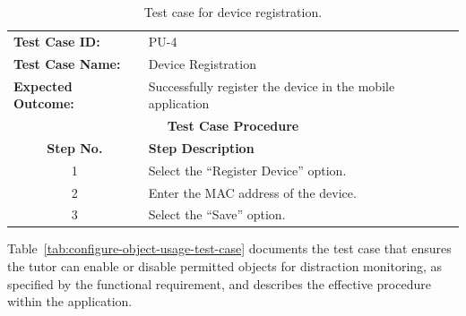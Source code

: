                 \begin{table}[!htbp]
                    \centering
                    \caption{Test case for device registration.}
                    \label{tab:device-registration-test-case}
                    \begin{tabularx}{\textwidth}{l X}
                        \toprule
                        \textbf{Test Case ID:} & PU-4 \\
                        \textbf{Test Case Name:} & Device Registration \\
                        \textbf{Expected Outcome:} & Successfully register the device in the mobile application \\
                        \midrule
                        \multicolumn{2}{c}{\textbf{Test Case Procedure}} \\
                        \midrule
                        \multicolumn{1}{c}{\textbf{Step No.}} & \textbf{Step Description} \\
                        \midrule
                        \multicolumn{1}{c}{1} & Select the ``Register Device'' option. \\
                        \multicolumn{1}{c}{2} & Enter the MAC address of the device. \\
                        \multicolumn{1}{c}{3} & Select the ``Save'' option. \\
                        \bottomrule
                    \end{tabularx}
                \end{table}
                
                Table~\ref{tab:configure-object-usage-test-case} documents the test case that ensures the tutor can enable or disable permitted objects for distraction monitoring, as specified by the functional requirement, and describes the effective procedure within the application.
                
